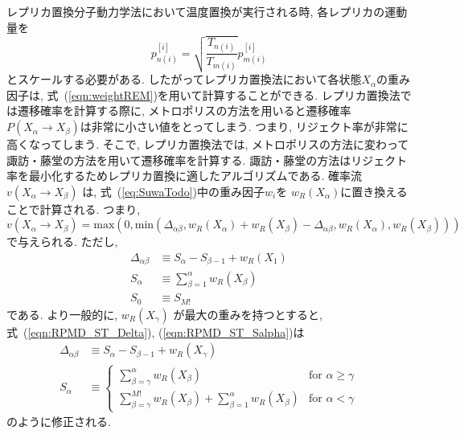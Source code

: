 レプリカ置換分子動力学法において温度置換が実行される時, 各レプリカの運動量を
\begin{equation}
 p_{n(i)}^{[i]} = \sqrt{\frac{T_{n(i)}}{T_{m(i)}}} p_{m(i)}^{[i]}
\end{equation}
とスケールする必要がある.
したがってレプリカ置換法において各状態$X_{\alpha}$の重み因子は, 式~(\ref{eqn:weightREM})を用いて計算することができる.
レプリカ置換法では遷移確率を計算する際に, メトロポリスの方法を用いると遷移確率
$P(X_{\alpha} \to X_{\beta})$は非常に小さい値をとってしまう\cite{Itoh2013JCTC}.
つまり, リジェクト率が非常に高くなってしまう.
そこで, レプリカ置換法では, メトロポリスの方法に変わって諏訪・藤堂の方法を用いて遷移確率を計算する.
諏訪・藤堂の方法はリジェクト率を最小化するためレプリカ置換に適したアルゴリズムである.
確率流 $v(X_{\alpha} \to X_{\beta})$ は, 式~(\ref{eq:SuwaTodo})中の重み因子$w_{i}$を
$w_{R}(X_{\alpha})$に置き換えることで計算される. つまり,
\begin{equation}
 v(X_{\alpha} \to X_{\beta}) = \mathrm{max} (0,\mathrm{min}(\Delta_{\alpha \beta},w_{R}(X_{\alpha})+w_{R}(X_{\beta})-\Delta_{\alpha \beta},w_{R}(X_{\alpha}),w_{R}(X_{\beta}))) \label{eqn:STRPMD}
\end{equation}
で与えられる. ただし,
\begin{align}
 \Delta_{\alpha \beta} &\equiv S_{\alpha} -S_{\beta - 1} + w_{R}(X_{1})
 \label{eqn:RPMD_ST_Delta}
 \\
 S_{\alpha} &\equiv \sum_{\beta=1}^{\alpha} w_{R} (X_{\beta})
 \label{eqn:RPMD_ST_Salpha}
 \\
 S_{0}&\equiv S_{M!}
\end{align}
である.
より一般的に, $w_{R}(X_{\gamma})$ が最大の重みを持つとすると, 式~(\ref{eqn:RPMD_ST_Delta}), (\ref{eqn:RPMD_ST_Salpha})は
\begin{align}
	\Delta_{\alpha \beta} &\equiv
	S_{\alpha} -S_{\beta - 1} + w_{R}(X_{\gamma})
 	\\
	S_{\alpha} &\equiv
		\begin{cases}
		   \displaystyle \sum_{\beta=\gamma}^{\alpha} w_{R}(X_{\beta}) &\text{for $\alpha \geq \gamma$} \\
		   \displaystyle \sum_{\beta=\gamma}^{M!} w_{R}(X_{\beta})+ \sum_{\beta=1}^{\alpha} w_{R}(X_{\beta}) &\text{for $\alpha < \gamma$}
		  \end{cases}
\end{align}
のように修正される.

